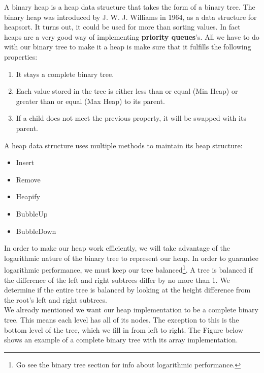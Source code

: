 
A binary heap is a heap data structure that takes the form of a binary tree. The binary heap was introduced by J. W. J. Williams in 1964, as a data structure for  \gls{heapsort}. It turns out, it could be used for more than sorting values. In fact heaps are a very good way of implementing \textbf{priority queues}'s. All we have to do with our binary tree to make it a heap is make sure that it fulfills the following properties:

\begin{enumerate}
	\tightlist
	\item It stays a \gls{complete} binary tree. 
	\item Each value stored in the tree is either less than or equal (Min Heap) or greater than or equal (Max Heap) to its parent. 
	\item If a child does not meet the previous property, it will be swapped with its parent.
\end{enumerate}

A heap data structure uses multiple methods to maintain its heap structure:

\begin{itemize}
	\tightlist
	\item Insert
	\item Remove 
	\item Heapify
	\item BubbleUp
	\item BubbleDown
\end{itemize}


In order to make our heap work efficiently, we will take advantage of the logarithmic nature of the binary tree to represent our heap. In order to guarantee logarithmic performance, we must keep our tree balanced\footnote{Go see the binary tree section for info about logarithmic performance.}. A tree is balanced if the difference of the left and right subtrees differ by no more than 1. We determine if the entire tree is balanced by looking at the height difference from the root's left and right subtrees.\\

We already mentioned we want our heap implementation to be a \gls{complete} binary tree. This means each level has all of its nodes. The exception to this is the bottom level of the tree, which we fill in from left to right. The Figure below shows an example of a complete binary tree with its array implementation.


